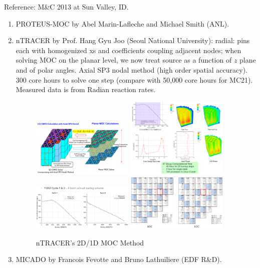\documentclass{school-22.211-notes}
\begin{document}
Reference: M\&C 2013 at Sun Valley, ID. 
\begin{enumerate}
\item PROTEUS-MOC by Abel Marin-Lafleche and Michael Smith (ANL). 

\item nTRACER by Prof. Hang Gyu Joo (Seoul National University): radial: pins each with homogenized xs and coefficients coupling adjacent nodes; when solving MOC on the planar level, we now treat source as a function of $z$ plane and of polar angles. Axial SP3 nodal method (high order spatial accuracy). 300 core hours to solve one step (compare with 50,000 core hours for MC21). Measured data is from Radian reaction rates. 
  \begin{figure}[h]
    \centering
    \includegraphics[width=0.46\textwidth]{images/methd/nTRACER.png}
    \includegraphics[width=0.46\textwidth]{images/methd/nTRACER-1.png}
    \includegraphics[width=0.46\textwidth]{images/methd/nTRACER-2.png}
    \includegraphics[width=0.46\textwidth]{images/methd/nTRACER-3.png}
    \caption{nTRACER's 2D/1D MOC Method} \label{nTRACER} 
  \end{figure}

\item MICADO by Francois Fevotte and Bruno Lathuiliere (EDF R\&D). 
\end{enumerate}
\end{document}

